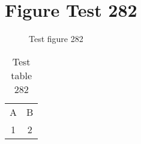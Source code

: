 \documentclass{article}
\begin{document}
\section{Figure Test 282}
\begin{figure}[h]
\caption{Test figure 282}
\end{figure}
\begin{table}[h]
\caption{Test table 282}
\begin{tabular}{cc}
A & B \\
1 & 2
\end{tabular}
\end{table}
\end{document}
